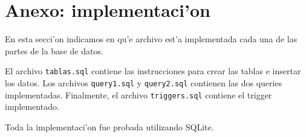 \section{Anexo: implementaci'on}

En esta secci'on indicamos en qu'e archivo est'a implementada cada una de las partes de la base de datos.

El archivo \texttt{tablas.sql} contiene las instrucciones para crear las tablas e insertar los datos. Los archivos \texttt{query1.sql} y \texttt{query2.sql} contienen las dos queries implementadas. Finalmente, el archivo \texttt{triggers.sql} contiene el trigger implementado.

Toda la implementaci'on fue probada utilizando \textsf{SQLite}.